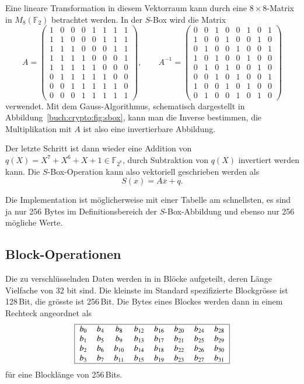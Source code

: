 Eine lineare Transformation in diesem Vektorraum kann durch eine
$8\times 8$-Matrix in $M_8(\mathbb{F}_2)$ betrachtet werden.
In der $S$-Box wird die Matrix
\[
A=
\begin{pmatrix}
1&0&0&0&1&1&1&1\\
1&1&0&0&0&1&1&1\\
1&1&1&0&0&0&1&1\\
1&1&1&1&0&0&0&1\\
1&1&1&1&1&0&0&0\\
0&1&1&1&1&1&0&0\\
0&0&1&1&1&1&1&0\\
0&0&0&1&1&1&1&1
\end{pmatrix},
\qquad
A^{-1}
=
\begin{pmatrix}
0&0&1&0&0&1&0&1\\
1&0&0&1&0&0&1&0\\
0&1&0&0&1&0&0&1\\
1&0&1&0&0&1&0&0\\
0&1&0&1&0&0&1&0\\
0&0&1&0&1&0&0&1\\
1&0&0&1&0&1&0&0\\
0&1&0&0&1&0&1&0
\end{pmatrix}
\]
verwendet.
Mit dem Gauss-Algorithmus, schematisch dargestellt in
Abbildung~\ref{buch:crypto:fig:sbox}, kann man die Inverse
bestimmen, die Multiplikation mit $A$ ist also eine invertierbare
Abbildung.

Der letzte Schritt ist dann wieder eine Addition von
$q(X)=X^7+X^6+X+1\in \mathbb{F}_{2^8}$, durch Subtraktion
von $q(X)$ invertiert werden kann.
Die $S$-Box-Operation kann also vektoriell geschrieben werden als
\[
	S(x) = A\overline{x}+q.
\]

Die Implementation ist möglicherweise mit einer Tabelle am schnellsten,
es sind ja nur 256 Bytes im Definitionsbereich der $S$-Box-Abbildung
und ebenso nur 256 mögliche Werte.

\subsection{Block-Operationen
\label{buch:subsection:block-operationen}}
Die zu verschlüsselnden Daten werden in in Blöcke aufgeteilt, deren
Länge Vielfache von $32$ bit sind.
Die kleinste im Standard spezifizierte Blockgrösse ist 128\,Bit, die grösste ist 256\,Bit.
Die Bytes eines Blockes werden dann in einem Rechteck angeordnet
als
\begin{equation}
\begin{tabular}{|>{$}c<{$}>{$}c<{$}>{$}c<{$}>{$}c<{$}>{$}c<{$}>{$}c<{$}>{$}c<{$}>{$}c<{$}|}
\hline
 b_{0} & b_{4} & b_{8}  & b_{12} & b_{16} & b_{20} & b_{24} & b_{28} \\
 b_{1} & b_{5} & b_{9}  & b_{13} & b_{17} & b_{21} & b_{25} & b_{29} \\
 b_{2} & b_{6} & b_{10} & b_{14} & b_{18} & b_{22} & b_{26} & b_{30} \\
 b_{3} & b_{7} & b_{11} & b_{15} & b_{19} & b_{23} & b_{27} & b_{31} \\
\hline
\end{tabular}
\label{buch:crypto:eqn:block}
\end{equation}
für eine Blocklänge von 256\,Bits.



